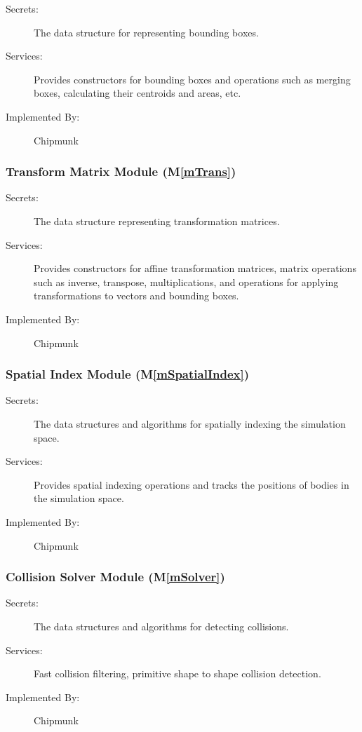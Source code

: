 \documentclass[12pt]{article}
\newcommand{\mref}[1]{M\ref{#1}}
\begin{document}
\begin{description}
	\item[Secrets:] The data structure for representing bounding boxes.
	\item[Services:] Provides constructors for bounding boxes and operations such as merging boxes, calculating their centroids and areas, etc.
	\item[Implemented By:] Chipmunk
\end{description}

\subsubsection{Transform Matrix Module (\mref{mTrans})}

\begin{description}
	\item[Secrets:] The data structure representing transformation matrices.
	\item[Services:] Provides constructors for affine transformation matrices, matrix operations such as inverse, transpose, multiplications, and operations for applying transformations to vectors and bounding boxes.
	\item[Implemented By:] Chipmunk
\end{description}

\subsubsection{Spatial Index Module (\mref{mSpatialIndex})}

\begin{description}
	\item[Secrets:] The data structures and algorithms for spatially indexing the simulation space.
	\item[Services:] Provides spatial indexing operations and tracks the positions of bodies in the simulation space.
	\item[Implemented By:] Chipmunk
\end{description}

\subsubsection{Collision Solver Module (\mref{mSolver})}

\begin{description}
	\item[Secrets:] The data structures and algorithms for detecting collisions.
	\item[Services:] Fast collision filtering, primitive shape to shape collision detection.
	\item[Implemented By:] Chipmunk
\end{description}
\end{document}
